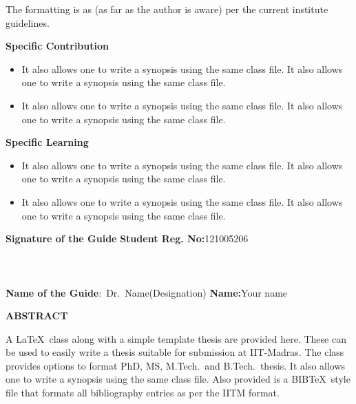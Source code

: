 \documentclass[a4paper, 12pt, oneside]{sastra}
\begin{document}
	The formatting is as (as far as the author is aware) per the current institute guidelines.
	
	\noindent \textbf{Specific Contribution}
	\begin{itemize}
		\item It also allows one to write a synopsis using the same class file. It also allows one to write a synopsis using the same class file.
		\item It also allows one to write a synopsis using the same class file. It also allows one to write a synopsis using the same class file.
	\end{itemize}
	\noindent \textbf{Specific Learning}
	\begin{itemize}
		\item It also allows one to write a synopsis using the same class file. It also allows one to write a synopsis using the same class file.
		\item It also allows one to write a synopsis using the same class file. It also allows one to write a synopsis using the same class file.
	\end{itemize}
	
	\vspace*{24pt}
	
	\noindent \textbf{Signature of the Guide} \hspace*{70mm} \textbf{Student Reg. No:}121005206\\
	\\
	\\
	\\
	\noindent \textbf{Name of the Guide}:~Dr.~Name(Designation) \hspace*{35mm} \textbf{Name:}Your name
	\pagebreak
	
	\begin{center}
		\Large{{\textbf{ABSTRACT}}}
	\end{center}
	
	
	\vspace*{24pt}
	
	\noindent A \LaTeX\ class along with a simple template thesis are provided here.  These can be used to easily write a thesis suitable for submission at IIT-Madras.  The class provides options to format PhD, MS, M.Tech.\ and B.Tech.\ thesis.  It also allows one to write a synopsis using the same class file.  Also provided is a BIB\TeX\ style file that formats all bibliography entries as per the IITM format.
	
\end{document}
